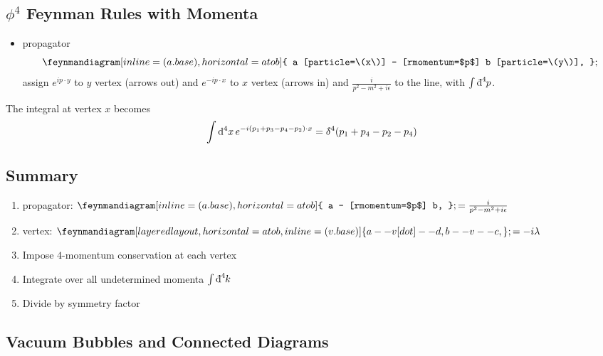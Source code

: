 \subsection{\texorpdfstring{$\phi^4$}{Phi four} Feynman Rules with Momenta}%
\label{sub:$phi^4$_phi_four_feynman_rules_with_momenta}

\begin{itemize}
  \item propagator
    \begin{equation}
      \feynmandiagram[inline=(a.base), horizontal=a to b] {
	a [particle=\(x\)] -- [rmomentum=$p$] b [particle=\(y\)],
      };
    \end{equation}
    assign $e^{i p \cdot y}$ to $y$ vertex (arrows out) and $e^{-i p \cdot x}$ to $x$ vertex (arrows in) and $\frac{i}{p^2 - m^2 + i \epsilon}$ to the line, with $\int \bdd[4]{p}$.
\end{itemize}
The integral at vertex $x$ 
becomes
\begin{equation}
  \int \dd[4]{x} e^{-i (p_1 + p_3 - p_4 - p_2) \cdot x} = \bdelta^4(p_1 + p_4 - p_2 - p_4)
\end{equation}

\subsection*{Summary}%

\begin{enumerate}
  \item propagator: \(
    \feynmandiagram[inline=(a.base), horizontal=a to b] {
      a -- [rmomentum=$p$] b,
    };
    = \frac{i}{p^2 - m^2 + i \epsilon}
    \)
  \item vertex: \(
    \feynmandiagram[layered layout, horizontal=a to b, inline=(v.base)]{
      a -- v [dot] -- d,
      b -- v -- c,
    };
    = -i \lambda
    \)
  \item Impose $4$-momentum conservation at each vertex
  \item Integrate over all undetermined momenta $\int \bdd[4]{k}$
  \item Divide by symmetry factor
\end{enumerate}

\subsection{Vacuum Bubbles and Connected Diagrams}%
\label{sub:vacuum_bubbles_and_connected_diagrams}

